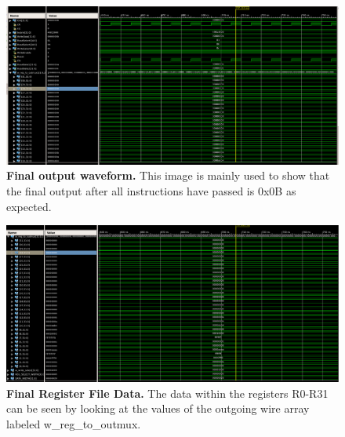\documentclass[letterpaper,12pt]{article}
\begin{document}
\begin{figure}[h] 
\centering
        \includegraphics[width=1.0\columnwidth]{Final_output_waveform}

        \caption{
                \label{fig:finaloutput}
                {\bf Final output waveform.}
               This image is mainly used to show that the final output after all instructions have passed is 0x0B as expected.
        }
\end{figure}

\begin{figure}[ht] 
\centering
        \includegraphics[width=1.0\columnwidth]{Final_reg_data_waveform}

        \caption{
                \label{fig:regwaveform}
                {\bf Final Register File Data.}
               The data within the registers R0-R31 can be seen by looking at the values of the outgoing wire array labeled w\_reg\_to\_outmux.
        }
\end{figure}
\end{document}
